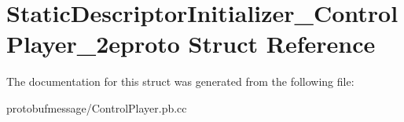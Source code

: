 \hypertarget{struct_static_descriptor_initializer___control_player__2eproto}{\section{Static\-Descriptor\-Initializer\-\_\-\-Control\-Player\-\_\-2eproto Struct Reference}
\label{struct_static_descriptor_initializer___control_player__2eproto}
}


The documentation for this struct was generated from the following file\-:\begin{DoxyCompactItemize}
\item 
protobufmessage/Control\-Player.\-pb.\-cc\end{DoxyCompactItemize}
